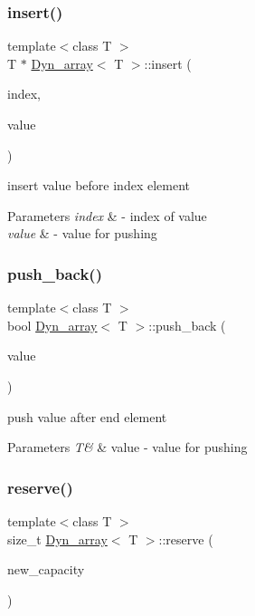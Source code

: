 \subsubsection{\texorpdfstring{insert()}{insert()}}
{\footnotesize\ttfamily template$<$class T $>$ \\
T $\ast$ \hyperlink{classDyn__array}{Dyn\+\_\+array}$<$ T $>$\+::insert (\begin{DoxyParamCaption}\item[{size\+\_\+t}]{index,  }\item[{const T \&}]{value }\end{DoxyParamCaption})}



insert value before index element 


\begin{DoxyParams}{Parameters}
{\em index} & -\/ index of value \\
\hline
{\em value} & -\/ value for pushing \\
\hline
\end{DoxyParams}
\mbox{\label{classDyn__array_a24797d477a7655bf37d1b1dd97eac1e3}} 
\subsubsection{\texorpdfstring{push\+\_\+back()}{push\_back()}}
{\footnotesize\ttfamily template$<$class T $>$ \\
bool \hyperlink{classDyn__array}{Dyn\+\_\+array}$<$ T $>$\+::push\+\_\+back (\begin{DoxyParamCaption}\item[{const T \&}]{value }\end{DoxyParamCaption})}



push value after end element 


\begin{DoxyParams}{Parameters}
{\em T\&} & value -\/ value for pushing \\
\hline
\end{DoxyParams}
\mbox{\label{classDyn__array_a8cc1e876bc20ce13490898be4bdd7882}} 
\subsubsection{\texorpdfstring{reserve()}{reserve()}}
{\footnotesize\ttfamily template$<$class T $>$ \\
size\+\_\+t \hyperlink{classDyn__array}{Dyn\+\_\+array}$<$ T $>$\+::reserve (\begin{DoxyParamCaption}\item[{const size\+\_\+t}]{new\+\_\+capacity }\end{DoxyParamCaption})}



